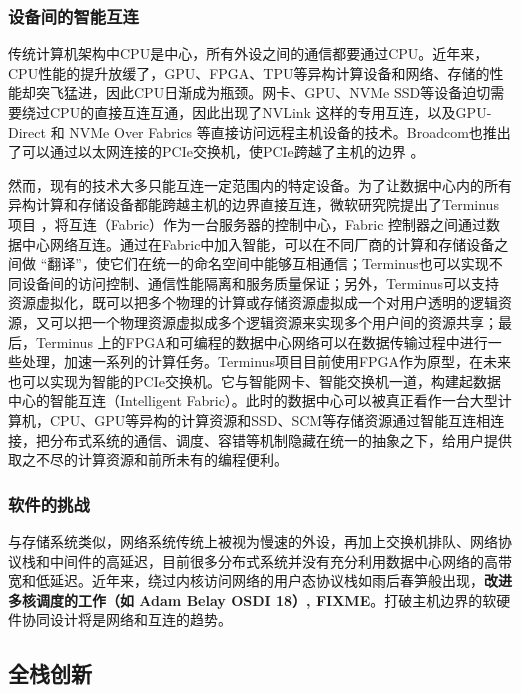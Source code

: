 \subsubsection{设备间的智能互连}

传统计算机架构中CPU是中心，所有外设之间的通信都要通过CPU。近年来，CPU性能的提升放缓了，GPU、FPGA、TPU等异构计算设备和网络、存储的性能却突飞猛进，因此CPU日渐成为瓶颈。网卡、GPU、NVMe SSD等设备迫切需要绕过CPU的直接互连互通，因此出现了NVLink \cite{foley2017ultra} 这样的专用互连，以及GPU-Direct \cite{gpu-direct} 和 NVMe Over Fabrics \cite{minturn2015nvm} 等直接访问远程主机设备的技术。Broadcom也推出了可以通过以太网连接的PCIe交换机，使PCIe跨越了主机的边界 \cite{broadcom-expressfabric}。

然而，现有的技术大多只能互连一定范围内的特定设备。为了让数据中心内的所有异构计算和存储设备都能跨越主机的边界直接互连，微软研究院提出了Terminus项目 \cite{direct-universal-access-making-data-center-resources-available-to-fpga}，将互连（Fabric）作为一台服务器的控制中心，Fabric 控制器之间通过数据中心网络互连。通过在Fabric中加入智能，可以在不同厂商的计算和存储设备之间做 ``翻译''，使它们在统一的命名空间中能够互相通信；Terminus也可以实现不同设备间的访问控制、通信性能隔离和服务质量保证；另外，Terminus可以支持资源虚拟化，既可以把多个物理的计算或存储资源虚拟成一个对用户透明的逻辑资源，又可以把一个物理资源虚拟成多个逻辑资源来实现多个用户间的资源共享；最后，Terminus 上的FPGA和可编程的数据中心网络可以在数据传输过程中进行一些处理，加速一系列的计算任务。Terminus项目目前使用FPGA作为原型，在未来也可以实现为智能的PCIe交换机。它与智能网卡、智能交换机一道，构建起数据中心的智能互连（Intelligent Fabric）。此时的数据中心可以被真正看作一台大型计算机，CPU、GPU等异构的计算资源和SSD、SCM等存储资源通过智能互连相连接，把分布式系统的通信、调度、容错等机制隐藏在统一的抽象之下，给用户提供取之不尽的计算资源和前所未有的编程便利。


\subsubsection{软件的挑战}

与存储系统类似，网络系统传统上被视为慢速的外设，再加上交换机排队、网络协议栈和中间件的高延迟，目前很多分布式系统并没有充分利用数据中心网络的高带宽和低延迟。近年来，绕过内核访问网络的用户态协议栈如雨后春笋般出现，\textbf{改进多核调度的工作（如 Adam Belay OSDI 18）, FIXME}。打破主机边界的软硬件协同设计将是网络和互连的趋势。

\subsection{全栈创新}

